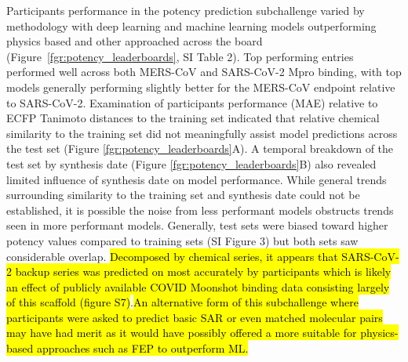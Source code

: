 \documentclass[journal=jcim,manuscript=article]{achemso}
\begin{document}
Participants performance in the potency prediction subchallenge varied by methodology with deep learning and machine learning models outperforming physics based and other approached across the board (Figure~\ref{fgr:potency_leaderboards}, SI Table 2). Top performing entries performed well across both MERS-CoV and SARS-CoV-2 Mpro binding, with top models generally performing slightly better for the MERS-CoV endpoint relative to SARS-CoV-2. Examination of participants performance (MAE) relative to ECFP Tanimoto distances to the training set indicated that relative chemical similarity to the training set did not meaningfully assist model predictions across the test set (Figure \ref{fgr:potency_leaderboards}A). A temporal breakdown of the test set by synthesis date (Figure \ref{fgr:potency_leaderboards}B) also revealed limited influence of synthesis date on model performance. While general trends surrounding similarity to the training set and synthesis date could not be established, it is possible the noise from less performant models obstructs trends seen in more performant models. Generally, test sets were biased toward higher potency values compared to training sets (SI Figure 3) but both sets saw considerable overlap. \hl{Decomposed by chemical series, it appears that SARS-CoV-2 backup series was predicted on most accurately by participants which is likely an effect of publicly available COVID Moonshot binding data consisting largely of this scaffold (figure S7)}.\hl{An alternative form of this subchallenge where participants were asked to predict basic SAR or even matched molecular pairs may have had merit as it would have possibly offered a more suitable for physics-based approaches such as FEP to outperform ML.}
\end{document}
